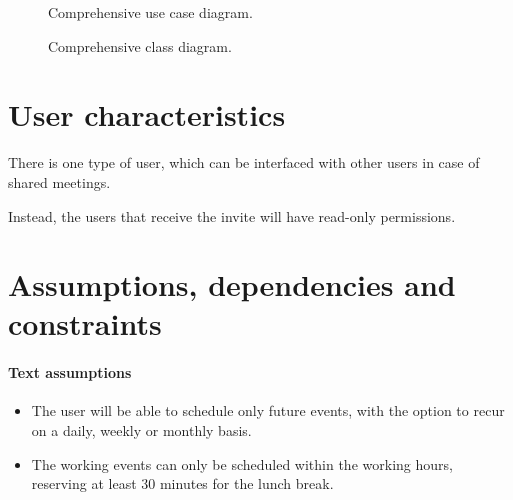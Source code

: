 \begin{figure}[H]
  \centerline{ }
  \caption{Comprehensive use case diagram.}   
\end{figure}

\begin{figure}[H]
 \centerline{ }
 \caption{Comprehensive class diagram.}  
\end{figure}

\section{User characteristics}
\label{sec:usercharacteristics}
\begin{description}
\item There is one type of user, which can be interfaced with other users in case of shared meetings.
\item Instead, the users that receive the invite will have read-only permissions.
\end{description}



\section{Assumptions, dependencies and constraints}
\label{sec:assumpdepenconst}

\paragraph{Text assumptions}
\begin{itemize}
\item The user will be able to schedule only future events, with the option to recur on a daily, weekly or monthly basis.
\item The working events can only be scheduled within the working hours, reserving at least 30 minutes for the lunch break.
\end{itemize}

